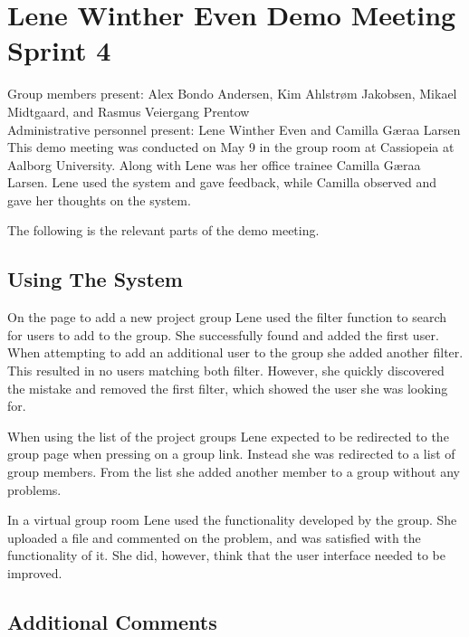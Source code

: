 \section{Lene Winther Even Demo Meeting Sprint 4}
\label{sec:lenedemotwo}
Group members present: Alex Bondo Andersen, Kim Ahlstr\o{}m Jakobsen, Mikael Midtgaard, and Rasmus Veiergang Prentow\\
Administrative personnel present: Lene Winther Even and Camilla G\ae{}raa Larsen\\

This demo meeting was conducted on May 9\ths{} in the group room at Cassiopeia at Aalborg University.
Along with Lene was her office trainee Camilla G\ae{}raa Larsen. 
Lene used the system and gave feedback, while Camilla observed and gave her thoughts on the system.

The following is the relevant parts of the demo meeting.

\subsection*{Using The System}
On the page to add a new project group Lene used the filter function to search for users to add to the group.
She successfully found and added the first user.
When attempting to add an additional user to the group she added another filter. 
This resulted in no users matching both filter. 
However, she quickly discovered the mistake and removed the first filter, which showed the user she was looking for.

When using the list of the project groups Lene expected to be redirected to the group page when pressing on a group link.
Instead she was redirected to a list of group members.
From the list she added another member to a group without any problems.

In a virtual group room Lene used the functionality developed by the \supervisorgroup group.
She uploaded a file and commented on the problem, and was satisfied with the functionality of it.
She did, however, think that the user interface needed to be improved.

\subsection*{Additional Comments}

